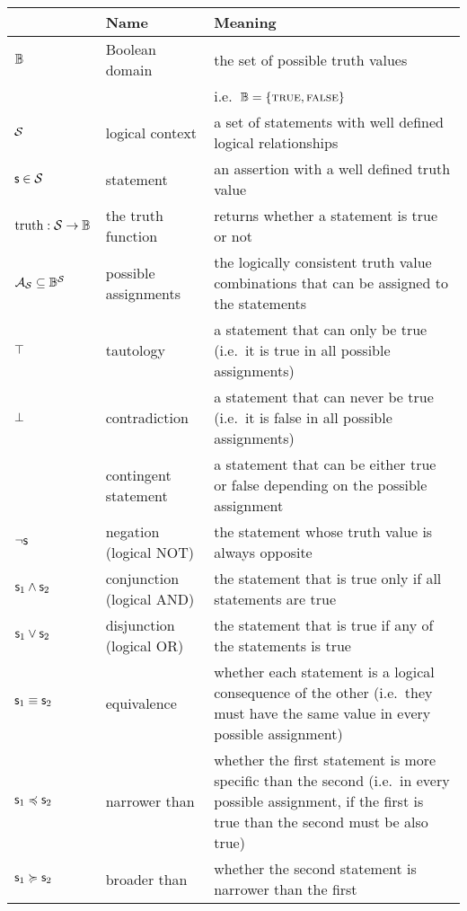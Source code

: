 \documentclass[11pt,letterpaper,fleqn]{memoir} %
\begin{document}
\begin{tabular}{p{} p{} p{}}
	& Name & Meaning  \\ 
	\hline 
	$\mathbb{B}$  & Boolean domain & the set of possible truth values \\ 
	&  & i.e.~$\mathbb{B} = \{\textsc{true}, \textsc{false}\}$ \\ 
	\hline 
	$\mathcal{S}$ & logical context & a set of statements with well defined logical relationships \\ 
	\hline 
	$\mathsf{s} \in \mathcal{S}$ & statement & an assertion with a well defined truth value \\ 
	\hline 
	$\operatorname{truth} : \mathcal{S} \to \mathbb{B}$ & the truth function & returns whether a statement is true or not  \\ 
	\hline 
	$\mathcal{A}_{\mathcal{S}} \subseteq \mathbb{B}^{\mathcal{S}}$& possible assignments & the logically consistent truth value combinations that can be assigned to the statements \\ 
	\hline 
	$\top$ & tautology & a statement that can only be true (i.e.~it is true in all possible assignments) \\ 
	\hline 
	$\bot$ & contradiction & a statement that can never be true (i.e.~it is false in all possible assignments) \\ 
	\hline 
	& contingent statement & a statement that can be either true or false depending on the possible assignment \\ 
	\hline 
	$\neg \mathsf{s}$ & negation (logical NOT) & the statement whose truth value is always opposite \\ 
	\hline 
	$\mathsf{s}_1 \wedge \mathsf{s}_2$ & conjunction (logical AND) & the statement that is true only if all statements are true \\ 
	\hline 
	$\mathsf{s}_1 \vee \mathsf{s}_2$ & disjunction (logical OR) & the statement that is true if any of the statements is true \\ 
	\hline 
	$\mathsf{s}_1 \equiv \mathsf{s}_2$ & equivalence & whether each statement is a logical consequence of the other (i.e.~they must have the same value in every possible assignment) \\ 
	\hline 
	$\mathsf{s}_1 \preccurlyeq \mathsf{s}_2$ & narrower than & whether the first statement is more specific than the second (i.e.~in every possible assignment, if the first is true than the second must be also true) \\ 
	\hline 
	$\mathsf{s}_1 \succcurlyeq \mathsf{s}_2$ & broader than & whether the second statement is narrower than the first \\ 
	\hline 

\end{tabular}
\end{document}
